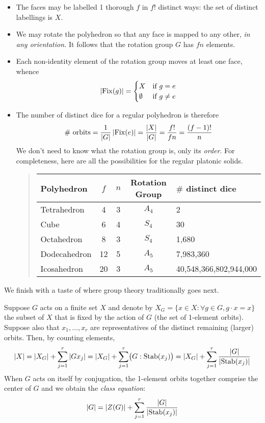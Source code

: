 \begin{itemize}
  \item The faces may be labelled 1 thorough $f$ in $f!$ distinct ways: the set of distinct labellings is $X$.
  \item We may rotate the polyhedron so that any face is mapped to any other, \emph{in any orientation.} It follows that the rotation group $G$ has $fn$ elements.
	\item Each non-identity element of the rotation group moves at least one face, whence
	\[
		\left| \operatorname{Fix}(g)\right|=
		\begin{cases}
			X&\text{if }g=e\\
			\emptyset&\text{if }g\neq e
		\end{cases}
	\]
	\item The number of distinct dice for a regular polyhedron is therefore
	\[
		\text{\# orbits}
		=\frac 1{\left| G\right|}\left| \operatorname{Fix}(e)\right|
		=\frac{\left| X\right|}{\left| G\right|}
		=\frac{f!}{fn}
		=\frac{(f-1)!}{n}
	\]
	We don't need to know what the rotation group is, only its \emph{order}. For completeness, here are all the possibilities for the regular platonic solids.
	\begin{quote}
		\begin{tabular}{l|c|c|c|l}
			Polyhedron & $f$ & $n$ & Rotation Group & $\#$ distinct dice\\\hline
			Tetrahedron & 4 & 3 & $A_4$ & 2\\
			Cube & 6 & 4 & $S_4$ & 30\\
			Octahedron & 8 & 3 &  $S_4$ & 1,680\\
			Dodecahedron & 12 & 5 & $A_5$ & 7,983,360\\
			Icosahedron & 20 & 3 & $A_5$ & 40,548,366,802,944,000
		\end{tabular}
	\end{quote}
\end{itemize} 


\goodbreak


We finish with a taste of where group theory traditionally goes next.\smallbreak

Suppose $G$ acts on a finite set $X$ and denote by $X_G=\{x\in X:\forall g\in G, g\cdot x=x\}$ the subset of $X$ that is fixed by the action of $G$ (the set of 1-element orbits). Suppose also that $x_1,\ldots,x_r$ are representatives of the distinct remaining (larger) orbits. Then, by counting elements,
\[
	\left| X\right|=\left| X_G\right|+\sum_{j=1}^r\left| Gx_j\right| 
	=\left| X_G\right|+\sum_{j=1}^r\bigl(G:\operatorname{Stab}(x_j)\bigr)
	=\left| X_G\right|+ \sum_{j=1}^r \frac{\left| G\right|}{\left| \operatorname{Stab}(x_j)\right|}
\]
When $G$ acts on itself by conjugation, the 1-element orbits together comprise the center of $G$ and we obtain the \emph{class equation}:
\[
	\left| G\right| =\left| Z(G)\right|+\sum_{j=1}^r \frac{\left| G\right|}{\left| \operatorname{Stab}(x_j)\right|}
\]

